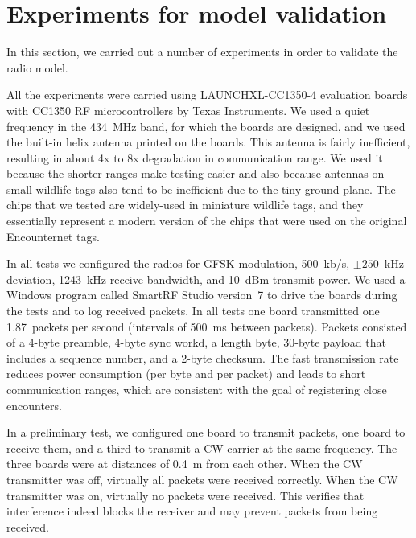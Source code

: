 \section{Experiments for model validation}
\label{experiments}

In this section, we carried out a number of experiments in order to validate the radio model. 

All the experiments were carried using LAUNCHXL-CC1350-4 evaluation boards with CC1350 RF microcontrollers 
by Texas Instruments. We used a quiet frequency in the 434~MHz band, for which the boards are designed,
and we used the built-in helix antenna printed on the boards. This antenna is fairly inefficient, resulting
in about 4x to 8x degradation in communication range. We used it because the shorter 
ranges make testing easier
and also because antennas on small wildlife tags also tend to be inefficient due to the tiny ground plane.
The chips that we tested are widely-used in miniature wildlife tags, and they essentially represent a modern
version of the chips that were used on the original Encounternet tags.

In all tests we configured the radios for GFSK modulation, 500~kb/s, $\pm 250$~kHz deviation, 1243~kHz receive bandwidth,
and 10~dBm transmit power. We used a Windows program called SmartRF Studio version~7 to drive the boards during
the tests and to log received packets. In all tests one board transmitted one 1.87~packets per second (intervals of
500~ms between packets). Packets consisted of a 4-byte preamble, 4-byte sync workd, a length byte, 30-byte payload 
that includes a sequence number, and a 2-byte checksum. The fast transmission rate reduces power consumption (per byte and
per packet) and leads to short communication ranges, which are consistent with the goal of registering close encounters.

In a preliminary test, we configured one board to transmit packets, one board to receive them, and a third to transmit a 
CW carrier at the same frequency. The three boards were at distances of 0.4~m from each other. When the CW transmitter
was off, virtually all packets were received correctly. When the CW transmitter was on, virtually no packets were received.
This verifies that interference indeed blocks the receiver and may prevent packets from being received.

